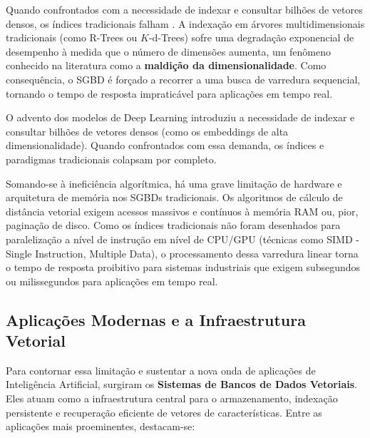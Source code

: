 \documentclass[12pt]{article}
\begin{document}
	Quando confrontados com a necessidade de indexar e consultar bilhões de vetores densos, os índices tradicionais falham \cite{malkov2020efficient}. A indexação em árvores multidimensionais tradicionais (como R-Trees ou $K\text{-d}$-Trees) sofre uma degradação exponencial de desempenho à medida que o número de dimensões aumenta, um fenômeno conhecido na literatura como a \textbf{maldição da dimensionalidade}. Como consequência, o SGBD é forçado a recorrer a uma busca de varredura sequencial, tornando o tempo de resposta impraticável para aplicações em tempo real.
    
    O advento dos modelos de Deep Learning introduziu a necessidade de indexar e consultar bilhões de vetores densos (como os embeddings de alta dimensionalidade). Quando confrontados com essa demanda, os índices e paradigmas tradicionais colapsam por completo.
    
    Somando-se à ineficiência algorítmica, há uma grave limitação de hardware e arquitetura de memória nos SGBDs tradicionais. Os algoritmos de cálculo de distância vetorial exigem acessos massivos e contínuos à memória RAM ou, pior, paginação de disco. Como os índices tradicionais não foram desenhados para paralelização a nível de instrução em nível de CPU/GPU (técnicas como SIMD - Single Instruction, Multiple Data), o processamento dessa varredura linear torna o tempo de resposta proibitivo para sistemas industriais que exigem subsegundos ou milissegundos para aplicações em tempo real.
	
	\subsection{Aplicações Modernas e a Infraestrutura Vetorial}
	
	Para contornar essa limitação e sustentar a nova onda de aplicações de Inteligência Artificial, surgiram os \textbf{Sistemas de Bancos de Dados Vetoriais}. Eles atuam como a infraestrutura central para o armazenamento, indexação persistente e recuperação eficiente de vetores de características. Entre as aplicações mais proeminentes, destacam-se:
	
\end{document}
